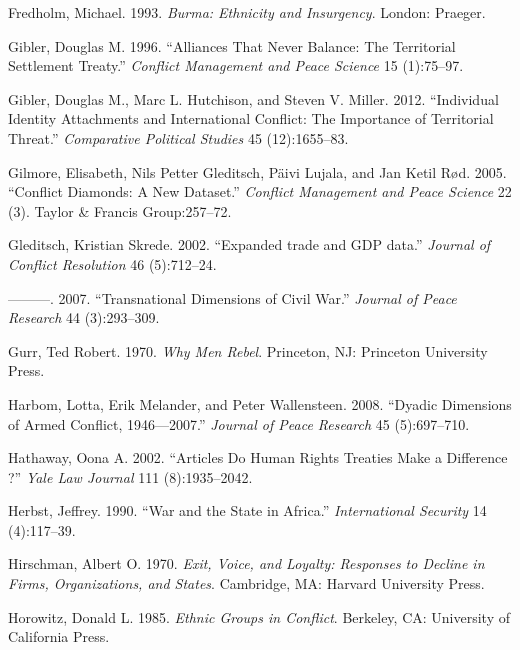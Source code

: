 \documentclass[12pt,]{book}
\theoremstyle{definition}
\theoremstyle{definition}
\theoremstyle{definition}
\theoremstyle{remark}
\begin{document}
\leavevmode\hypertarget{ref-Fredholm1993}{}%
Fredholm, Michael. 1993. \emph{Burma: Ethnicity and Insurgency}. London:
Praeger.

\leavevmode\hypertarget{ref-Gibler1996}{}%
Gibler, Douglas M. 1996. ``Alliances That Never Balance: The Territorial
Settlement Treaty.'' \emph{Conflict Management and Peace Science} 15
(1):75--97.

\leavevmode\hypertarget{ref-Gibler2012}{}%
Gibler, Douglas M., Marc L. Hutchison, and Steven V. Miller. 2012.
``Individual Identity Attachments and International Conflict: The
Importance of Territorial Threat.'' \emph{Comparative Political Studies}
45 (12):1655--83.

\leavevmode\hypertarget{ref-Gilmore2007}{}%
Gilmore, Elisabeth, Nils Petter Gleditsch, Päivi Lujala, and Jan Ketil
Rød. 2005. ``Conflict Diamonds: A New Dataset.'' \emph{Conflict
Management and Peace Science} 22 (3). Taylor \& Francis Group:257--72.

\leavevmode\hypertarget{ref-Gleditsch2002b}{}%
Gleditsch, Kristian Skrede. 2002. ``Expanded trade and GDP data.''
\emph{Journal of Conflict Resolution} 46 (5):712--24.

\leavevmode\hypertarget{ref-Gleditsch2007}{}%
---------. 2007. ``Transnational Dimensions of Civil War.''
\emph{Journal of Peace Research} 44 (3):293--309.

\leavevmode\hypertarget{ref-gurr70}{}%
Gurr, Ted Robert. 1970. \emph{Why Men Rebel}. Princeton, NJ: Princeton
University Press.

\leavevmode\hypertarget{ref-Harbom2008}{}%
Harbom, Lotta, Erik Melander, and Peter Wallensteen. 2008. ``Dyadic
Dimensions of Armed Conflict, 1946---2007.'' \emph{Journal of Peace
Research} 45 (5):697--710.

\leavevmode\hypertarget{ref-Hathaway2002}{}%
Hathaway, Oona A. 2002. ``Articles Do Human Rights Treaties Make a
Difference ?'' \emph{Yale Law Journal} 111 (8):1935--2042.

\leavevmode\hypertarget{ref-Herbst1990}{}%
Herbst, Jeffrey. 1990. ``War and the State in Africa.''
\emph{International Security} 14 (4):117--39.

\leavevmode\hypertarget{ref-Hirschman1970}{}%
Hirschman, Albert O. 1970. \emph{Exit, Voice, and Loyalty: Responses to
Decline in Firms, Organizations, and States}. Cambridge, MA: Harvard
University Press.

\leavevmode\hypertarget{ref-horowitz85}{}%
Horowitz, Donald L. 1985. \emph{Ethnic Groups in Conflict}. Berkeley,
CA: University of California Press.
\end{document}
